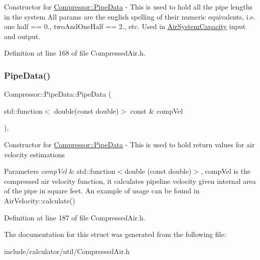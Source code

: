 Constructor for \hyperlink{struct_compressor_1_1_pipe_data}{Compressor\+::\+Pipe\+Data} -\/ This is used to hold all the pipe lengths in the system All params are the english spelling of their numeric equivalents, i.\+e. one half == 0., two\+And\+One\+Half == 2., etc. Used in \hyperlink{class_compressor_1_1_air_system_capacity}{Air\+System\+Capacity} input and output. 

Definition at line 168 of file Compressed\+Air.\+h.

\mbox{\label{struct_compressor_1_1_pipe_data_af7998fd533340b0a84e78fcda91b4806}} 
\subsubsection{\texorpdfstring{Pipe\+Data()}{PipeData()}\hspace{0.1cm}{\footnotesize\ttfamily [2/2]}}
{\footnotesize\ttfamily Compressor\+::\+Pipe\+Data\+::\+Pipe\+Data (\begin{DoxyParamCaption}\item[{std\+::function$<$ double(const double)$>$ const \&}]{comp\+Vel }\end{DoxyParamCaption})\hspace{0.3cm}{\ttfamily [inline]}, {\ttfamily [explicit]}}

Constructor for \hyperlink{struct_compressor_1_1_pipe_data}{Compressor\+::\+Pipe\+Data} -\/ This is used to hold return values for air velocity estimations 
\begin{DoxyParams}{Parameters}
{\em comp\+Vel} & std\+::function$<$double (const double)$>$, comp\+Vel is the compressed air velocity function, it calculates pipeline velocity given internal area of the pipe in square feet. An example of usage can be found in Air\+Velocity\+::calculate() \\
\hline
\end{DoxyParams}


Definition at line 187 of file Compressed\+Air.\+h.



The documentation for this struct was generated from the following file\+:\begin{DoxyCompactItemize}
\item 
include/calculator/util/Compressed\+Air.\+h\end{DoxyCompactItemize}
